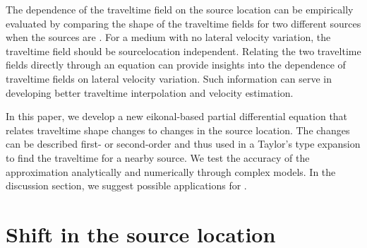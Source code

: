 The dependence of the traveltime field  on the source location
can be empirically evaluated by comparing the shape of the traveltime
fields for two different sources when the sources are  . For
a medium with no lateral velocity variation, the traveltime field
 should be source\geouline{-}location independent. Relating the two
traveltime fields directly through an equation can provide insights
into the dependence of traveltime fields on lateral velocity
variation. Such information can serve in developing better
traveltime interpolation and velocity estimation. 

In this paper, we develop a new eikonal-based partial differential
equation that relates traveltime shape changes to changes in the
source location.  The changes can be described 
first- or second-order   and thus
used in a Taylor's type expansion to find the traveltime for a nearby
source.  We test the accuracy of the approximation analytically and
numerically through   complex
 models. In the discussion section, we suggest possible
applications for  .

\section{Shift in the source location}



